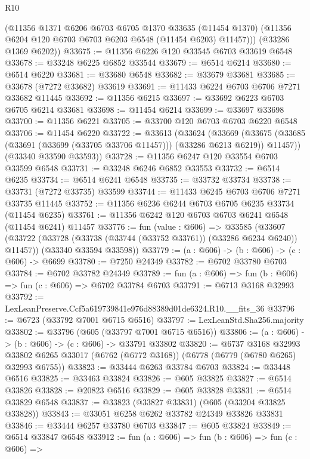 \begin{lexlean}{R10}
\begin{coremodule}
        (@11356
          @1371
          @6206
          @6703
          @6705
          @1370
          @33635
          (@11454 @1370)
          (@11356 @6204 @120 @6703 @6703 @6203 @6548 (@11454 @6203) @11457)))
      (@33286 @1369 @6202))
@33675 := @11356 @6226 @120 @33545 @6703 @33619 @6548
@33678 := @33248 @6225 @6852 @33544
@33679 := @6514 @6214
@33680 := @6514 @6220
@33681 := @33680 @6548
@33682 := @33679 @33681
@33685 := @33678 (@7272 @33682) @33619
@33691 := @11433 @6224 @6703 @6706 @7271 @33682 @11445
@33692 := @11356 @6215
@33697 := @33692 @6223 @6703 @6705 @6214 @33681
@33698 := @11454 @6214
@33699 := @33697 @33698
@33700 := @11356 @6221
@33705 := @33700 @120 @6703 @6703 @6220 @6548
@33706 := @11454 @6220
@33722 := @33613
    (@33624
      (@33669
        (@33675 (@33685 (@33691 (@33699 (@33705 @33706 @11457))) (@33286 @6213 @6219)) @11457))
      (@33340 @33590 @33593))
@33728 := @11356 @6247 @120 @33554 @6703 @33599 @6548
@33731 := @33248 @6246 @6852 @33553
@33732 := @6514 @6235
@33734 := @6514 @6241 @6548
@33735 := @33732 @33734
@33738 := @33731 (@7272 @33735) @33599
@33744 := @11433 @6245 @6703 @6706 @7271 @33735 @11445
@33752 := @11356 @6236 @6244 @6703 @6705 @6235 @33734 (@11454 @6235)
@33761 := @11356 @6242 @120 @6703 @6703 @6241 @6548 (@11454 @6241) @11457
@33776 := fun (value : @606) =>
  @33585
    (@33607
      (@33722 (@33728 (@33738 (@33744 (@33752 @33761)) (@33286 @6234 @6240)) @11457))
      (@33340 @33594 @33598))
@33779 := (a : @606) -> (b : @606) -> (c : @606) -> @6699
@33780 := @7250 @24349
@33782 := @6702 @33780 @6703
@33784 := @6702 @33782 @24349
@33789 := fun (a : @606) => fun (b : @606) => fun (c : @606) => @6702 @33784 @6703
@33791 := @6713 @3168 @32993
@33792 := LexLeanPreserve.Ccf5a619739841e976d88389d01de6324.R10.__fits_36
@33796 := @6723 (@33792 @7001 @6715 @6516)
@33797 := LexLeanStd.Sha256.majority
@33802 := @33796 (@605 (@33797 @7001 @6715 @6516))
@33806 := (a : @606) -> (b : @606) -> (c : @606) -> @33791 @33802
@33820 := @6737
    @3168
    @32993
    @33802
    @6265
    @33017
    (@6762 (@6772 @3168))
    (@6778 (@6779 (@6780 @6265) @32993 @6755))
@33823 := @33444 @6263 @33784 @6703
@33824 := @33448 @6516
@33825 := @33463 @33824
@33826 := @605 @33825
@33827 := @6514 @33826
@33828 := @20823 @6516
@33829 := @605 @33828
@33831 := @6514 @33829 @6548
@33837 := @33823 (@33827 @33831) (@605 (@33204 @33825 @33828))
@33843 := @33051 @6258 @6262 @33782 @24349 @33826 @33831
@33846 := @33444 @6257 @33780 @6703
@33847 := @605 @33824
@33849 := @6514 @33847 @6548
@33912 := fun (a : @606) =>
  fun (b : @606) =>
  fun (c : @606) =>

\end{coremodule}
\end{lexlean}
